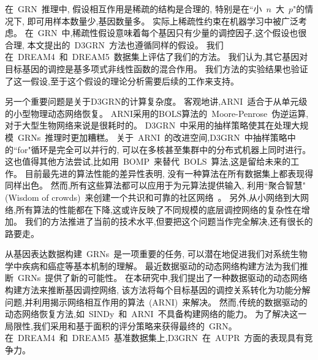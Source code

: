 在~GRN~推理中, 假设相互作用是稀疏的结构是合理的,
特别是在``小~$n$~大~$p$"的情况下, 即可用样本数量少,基因数量多。
实际上稀疏性约束在机器学习中被广泛考虑。
在~GRN~中,稀疏性假设意味着每个基因只有少量的调控因子,这个假设也很合理,
本文提出的~D3GRN~方法也遵循同样的假设。
我们在~DREAM4~和~DREAM5~数据集上评估了我们的方法。
我们认为,其它基因对目标基因的调控是基多项式非线性函数的混合作用。
我们方法的实验结果也验证了这一假设,至于这个假设的理论分析需要后续的工作来支持。

另一个重要问题是关于D3GRN的计算复杂度。
客观地讲,ARNI~适合于从单元级的小型物理动态网络恢复。
ARNI采用的BOLS算法的~Moore-Penrose~伪逆运算,对于大型生物网络来说是很耗时的。
D3GRN~中采用的抽样策略使其在处理大规模~GRNs~推理时更加糟糕。
关于~ARNI~的改进空间,D3GRN~中抽样策略中的``for"循环是完全可以并行的,
可以在多核甚至集群中的分布式机器上同时进行。
这也值得其他方法尝试,比如用~BOMP~\cite{majumdar2009fast}来替代~BOLS~算法,这是留给未来的工作。
目前最先进的算法性能的差异性表明,
没有一种算法在所有数据集上都表现得同样出色。
然而,所有这些算法都可以应用于为元算法提供输入,
利用``聚合智慧"(Wisdom of crowds)~来创建一个共识和可靠的社区网络~\cite{Marbach2012a,zheng2008gene}。
另外,从小网络到大网络,所有算法的性能都在下降,这或许反映了不同规模的底层调控网络的复杂性在增加。
我们的方法推进了当前的技术水平,但要把这个问题当作完全解决,还有很长的路要走。

从基因表达数据构建~GRNs~是一项重要的任务,
可以潜在地促进我们对系统生物学中疾病和癌症等基本机制的理解。
最近数据驱动的动态网络构建方法为我们推断~GRNs~提供了新的可能性。
在本研究中,我们提出了一种数据驱动的动态网络构建方法来推断基因调控网络,
该方法将每个目标基因的调控关系转化为功能分解问题,并利用揭示网络相互作用的算法~(ARNI)~来解决。
然而,传统的数据驱动的动态网络恢复方法,如~SINDy~和~ARNI~不具备构建网络的能力。
为了解决这一局限性,我们采用和基于面积的评分策略来获得最终的~GRN。
在~DREAM4~和~DREAM5~基准数据集上,D3GRN~在~AUPR~方面的表现具有竞争力。